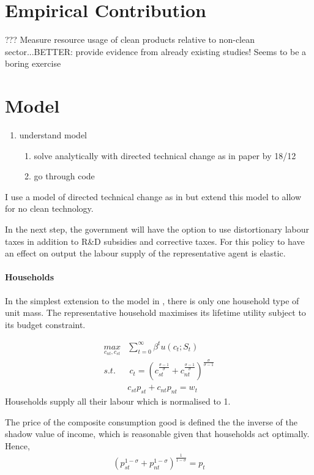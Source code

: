 \documentclass[12pt]{article}
\begin{document}
\section{Empirical Contribution}

???
Measure resource usage of clean products relative to non-clean sector...BETTER: provide evidence from already existing studies! Seems to be a boring exercise


\section{Model}
\begin{enumerate}
\item understand model
\begin{enumerate}
\item solve analytically with directed technical change as in paper
by 18/12
\item go through code
\end{enumerate}
\end{enumerate}

I use a model of directed technical change as in \cite{Acemoglu2012TheChange} but extend this model to allow for no clean technology. 

In the next step, the government will have the option to use distortionary labour taxes in addition to R\&D subsidies and corrective taxes. For this policy to have an effect on output the labour supply of the representative agent is elastic.
 


\paragraph{Households}
In the simplest extension to the model in \cite{Acemoglu2012TheChange}, there is only one household type of unit mass. The representative household maximises its lifetime utility subject to its budget constraint. 

\begin{align*}
\underset{c_{nt}, c_{st}}{max}&\sum_{t=0}^{\infty}\beta^t u(c_t; S_t)\\
s.t.& \ c_t= \left(c_{st}^{\frac{\sigma-1}{\sigma}} +c_{nt}^\frac{\sigma-1}{\sigma}\right)^\frac{\sigma}{\sigma-1}\\
& c_{st}p_{st}+c_{nt}p_{nt}=w_t
\end{align*}
Households supply all their labour which is normalised to 1. 

The price of the composite consumption good is defined the the inverse of the shadow value of income, which is reasonable given that households act optimally.
Hence,
\begin{align*}
\left(p_{st}^{1-\sigma}+p_{nt}^{1-\sigma}\right)^\frac{1}{1-\sigma}=p_t
\end{align*}
\end{document}
